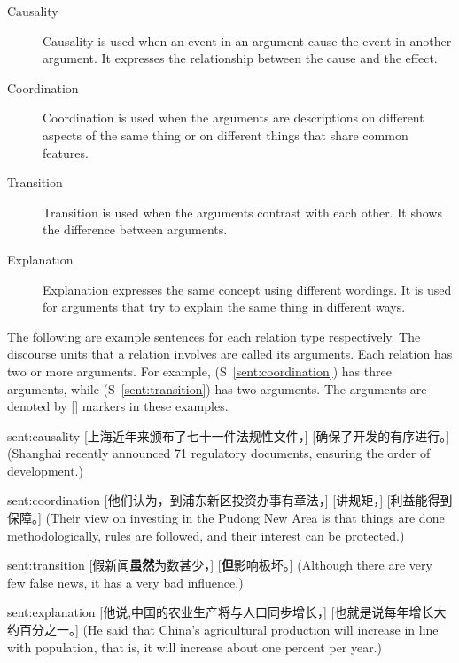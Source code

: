 \begin{description}
\item[Causality] Causality is used when an event in an argument cause the event
    in another argument. It expresses the relationship between the cause
    and the effect.
\item[Coordination] Coordination is used when the arguments are
    descriptions on different aspects of the same thing or
    on different things that share common features.
\item[Transition] Transition is used when the arguments contrast with each other.
    It shows the difference between arguments.
\item[Explanation] Explanation expresses the same concept using different wordings.
    It is used for arguments that try to explain the same thing in different
    ways.
\end{description}

The following are example sentences for each relation type respectively.
The discourse units that a relation involves are called its arguments.
Each relation has two or more arguments. For example, (S~\ref{sent:coordination}) has
three arguments, while (S~\ref{sent:transition}) has two arguments. The arguments are
denoted by [] markers in these examples.

\begin{sent}{sent:causality}{}
    [上海近年来颁布了七十一件法规性文件，] [确保了开发的有序进行。]
    (Shanghai recently announced 71 regulatory documents, ensuring
    the order of development.)
\end{sent}

\begin{sent}{sent:coordination}{}
    [他们认为，到浦东新区投资办事有章法，] [讲规矩，] [利益能得到保障。]
    (Their view on investing in the Pudong New Area is that
    things are done methodologically,
    rules are followed, and their interest can be protected.)
\end{sent}

\begin{sent}{sent:transition}{}
    [假新闻\textbf{虽然}为数甚少，] [\textbf{但}影响极坏。]
    (Although there are very few false news, it has a very bad influence.)
\end{sent}

\begin{sent}{sent:explanation}{}
    [他说,中国的农业生产将与人口同步增长，] [也就是说每年增长大约百分之一。]
    (He said that China's agricultural production will increase in line with
    population, that is, it will increase about one percent per year.)
\end{sent}

